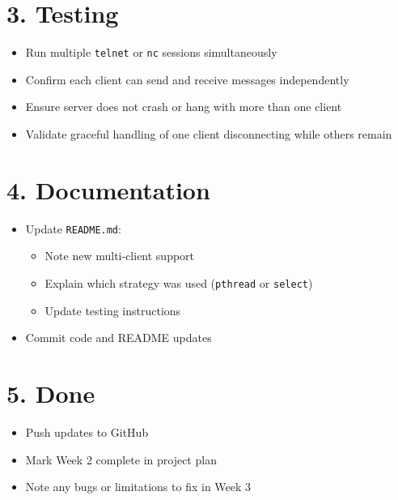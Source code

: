 \documentclass{article}
\begin{document}
\section*{3. Testing}
\begin{itemize}[label=--]
    \item Run multiple \texttt{telnet} or \texttt{nc} sessions simultaneously
    \item Confirm each client can send and receive messages independently
    \item Ensure server does not crash or hang with more than one client
    \item Validate graceful handling of one client disconnecting while others remain
\end{itemize}

\section*{4. Documentation}
\begin{itemize}[label=--]
    \item Update \texttt{README.md}:
    \begin{itemize}
        \item Note new multi-client support
        \item Explain which strategy was used (\texttt{pthread} or \texttt{select})
        \item Update testing instructions
    \end{itemize}
    \item Commit code and README updates
\end{itemize}

\section*{5. Done}
\begin{itemize}[label=--]
    \item Push updates to GitHub
    \item Mark Week 2 complete in project plan
    \item Note any bugs or limitations to fix in Week 3
\end{itemize}
\end{document}
